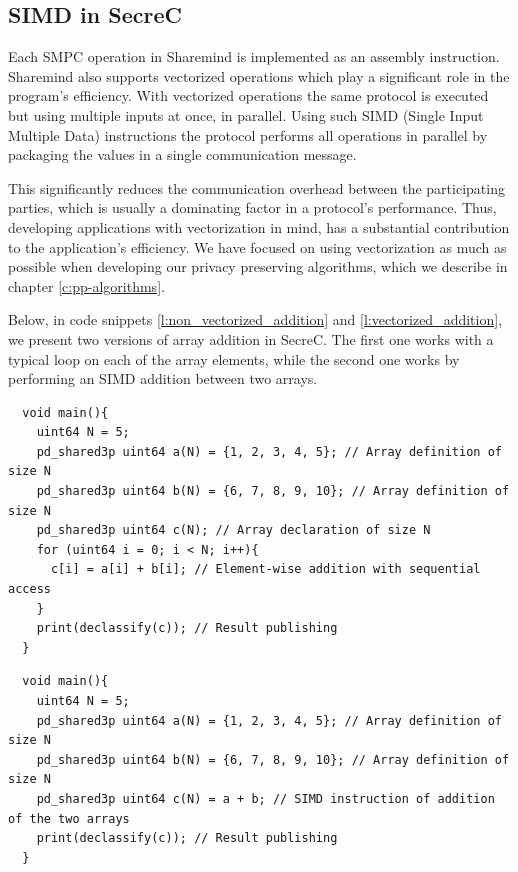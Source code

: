 \subsection{SIMD in SecreC}\label{ss:simd-secrec}

Each SMPC operation in Sharemind is implemented as an assembly instruction.
Sharemind also supports vectorized operations which play a significant role in the program's efficiency.
With vectorized operations the same protocol is executed but using multiple inputs at once, in parallel.
Using such SIMD (Single Input Multiple Data) instructions the protocol performs all operations in parallel by packaging the values in a single communication message.

This significantly reduces the communication overhead between the participating parties, which is usually a dominating factor in a protocol's performance.
Thus, developing applications with vectorization in mind, has a substantial contribution to the application's efficiency.
We have focused on using vectorization as much as possible when developing our privacy preserving algorithms, which we describe in chapter \ref{c:pp-algorithms}.

Below, in code snippets \ref{l:non_vectorized_addition} and \ref{l:vectorized_addition}, we present two versions of array addition in SecreC.
The first one works with a typical loop on each of the array elements, while the second one works by performing an SIMD addition between two arrays.

{
\begin{verbatim}
  void main(){
    uint64 N = 5;
    pd_shared3p uint64 a(N) = {1, 2, 3, 4, 5}; // Array definition of size N
    pd_shared3p uint64 b(N) = {6, 7, 8, 9, 10}; // Array definition of size N
    pd_shared3p uint64 c(N); // Array declaration of size N
    for (uint64 i = 0; i < N; i++){
      c[i] = a[i] + b[i]; // Element-wise addition with sequential access
    }
    print(declassify(c)); // Result publishing
  }
\end{verbatim}
\label{l:non_vectorized_addition}
}

{
\begin{verbatim}
  void main(){
    uint64 N = 5;
    pd_shared3p uint64 a(N) = {1, 2, 3, 4, 5}; // Array definition of size N
    pd_shared3p uint64 b(N) = {6, 7, 8, 9, 10}; // Array definition of size N
    pd_shared3p uint64 c(N) = a + b; // SIMD instruction of addition of the two arrays
    print(declassify(c)); // Result publishing
  }
\end{verbatim}
\label{l:vectorized_addition}
}


